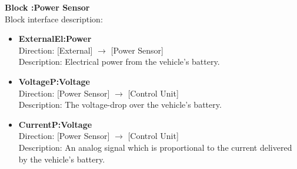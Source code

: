 \textbf{Block :Power Sensor}\\
Block interface description:
\begin{itemize}
	\item \textbf{ExternalEl:Power}\\
	Direction: [External] $\rightarrow$ [Power Sensor]\\
	Description: Electrical power from the vehicle's battery.
	\item \textbf{VoltageP:Voltage}\\
	Direction: [Power Sensor] $\rightarrow$ [Control Unit]\\
	Description: The voltage-drop over the vehicle's battery.
	\item \textbf{CurrentP:Voltage}\\
	Direction: [Power Sensor] $\rightarrow$ [Control Unit]\\
	Description: An analog signal which is proportional to the current delivered by the vehicle's battery.
\end{itemize}
									
